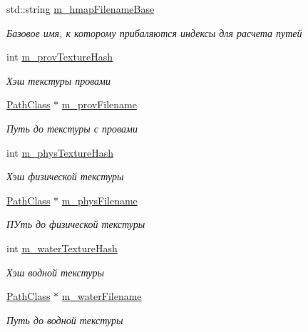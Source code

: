 \begin{DoxyCompactItemize}
std\+::string \hyperlink{class_terrain_class_a925d3a6e9863a2783c059feebfa20e5f}{m\+\_\+hmap\+Filename\+Base}
\begin{DoxyCompactList}\small\item\em Базовое имя, к которому прибаляются индексы для расчета путей \end{DoxyCompactList}\item 
int \hyperlink{class_terrain_class_a6c809d52743848453d22c46bb5313db9}{m\+\_\+prov\+Texture\+Hash}
\begin{DoxyCompactList}\small\item\em Хэш текстуры провами \end{DoxyCompactList}\item 
\hyperlink{class_path_class}{Path\+Class} $\ast$ \hyperlink{class_terrain_class_ab13946b0cba4699b6e3ab1b77bae7df8}{m\+\_\+prov\+Filename}
\begin{DoxyCompactList}\small\item\em Путь до текстуры с провами \end{DoxyCompactList}\item 
int \hyperlink{class_terrain_class_a7e4266d10a62f0ce48ec5559378568c9}{m\+\_\+phys\+Texture\+Hash}
\begin{DoxyCompactList}\small\item\em Хэш физической текстуры \end{DoxyCompactList}\item 
\hyperlink{class_path_class}{Path\+Class} $\ast$ \hyperlink{class_terrain_class_ab6c54c84319e70daa0a11d17197aa4b2}{m\+\_\+phys\+Filename}
\begin{DoxyCompactList}\small\item\em ПУть до физической текстуры \end{DoxyCompactList}\item 
int \hyperlink{class_terrain_class_af3a4066db7e24daa1edcab59118e1eb0}{m\+\_\+water\+Texture\+Hash}
\begin{DoxyCompactList}\small\item\em Хэш водной текстуры \end{DoxyCompactList}\item 
\hyperlink{class_path_class}{Path\+Class} $\ast$ \hyperlink{class_terrain_class_ab8c638c5d5188c83fb23ecc31a838a79}{m\+\_\+water\+Filename}
\begin{DoxyCompactList}\small\item\em Путь до водной текстуры \end{DoxyCompactList}\item 

\end{DoxyCompactItemize}

